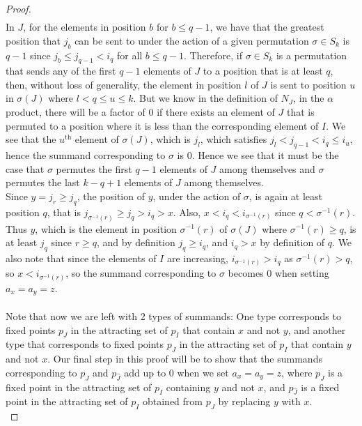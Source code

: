 \documentclass[12 pt]{article}
\theoremstyle{plain}
\theoremstyle{plain}
\theoremstyle{plain}
\theoremstyle{plain}
\theoremstyle{plain}
\theoremstyle{plain}
\theoremstyle{plain}
\theoremstyle{plain}
\theoremstyle{plain}
\theoremstyle{plain}
\theoremstyle{remark}
\theoremstyle{remark}
\theoremstyle{definition}
\theoremstyle{definition}
\theoremstyle{definition}
\theoremstyle{definition}
\theoremstyle{definition}
\theoremstyle{definition}
\begin{document}
\begin{proof}
\begin{align*}
\end{align*}
In $J$, for the elements in position $b$ for $b \leq q-1$, we have that the greatest position that $j_b$ can be sent to under the action of a given permutation $\sigma \in S_k$ is $q-1$ since $j_b \leq j_{q-1} < i_q$ for all $b \leq q-1$. Therefore, if $\sigma \in S_k$ is a permutation that sends any of the first $q-1$ elements of $J$ to a position that is at least $q$, then, without loss of generality, the element in position $l$ of $J$ is sent to position $u$ in $\sigma(J)$ where $l < q \leq u 
\leq k$. But we know in the definition of $N_J$, in the $\alpha$ product, there will be a factor of 0 if there exists an element of $J$ that is permuted to a position where it is less than the corresponding element of $I$. We see that the $u^{\text{th}}$ element of $\sigma(J)$, which is $j_l$, which satisfies $j_l < j_{q-1} < i_q \leq i_u$, hence the summand corresponding to $\sigma$ is 0. Hence we see that it must be the case that $\sigma$ permutes the first $q-1$ elements of $J$ among themselves and $\sigma$ permutes the last $k-q+1$ elements of $J$ among themselves.\\
Since $y = j_r \geq j_q$, the position of $y$, under the action of $\sigma$, is again at least position $q$, that is $j_{\sigma^{-1}(r)} \geq j_q > i_q > x$. Also, $x < i_q < i_{\sigma^{-1}(r)}$ since $q < \sigma^{-1}(r)$.\\
Thus $y$, which is the element in position $\sigma^{-1}(r)$ of $\sigma(J)$ where $\sigma^{-1}(r) \geq q$, is at least $j_q$ since $r \geq q$, and by definition $j_q \geq i_q$, and $i_q > x$ by definition of $q$. We also note that since the elements of $I$ are increasing, $i_{\sigma^{-1}(r)} > i_q$ as $\sigma^{-1}(r) > q$, so $x<i_{\sigma^{-1}(r)}$, so the summand corresponding to $\sigma$ becomes 0 when setting $a_x = a_y = z$.\\\\
Note that now we are left with 2 types of summands: One type corresponds to fixed points $p_{J}$ in the attracting set of $p_{I}$ that contain $x$ and not $y$, and another type that corresponds to fixed points $p_{J}$ in the attracting set of $p_{I}$ that contain $y$ and not $x$. Our final step in this proof will be to show that the summands corresponding to $p_{J}$ and $p_{\hat{J}}$ add up to 0 when we set $a_{x}=a_{y}=z$, where $p_{J}$ is a fixed point in the attracting set of $p_{I}$ containing $y$ and not $x$, and $p_{\hat{J}}$ is a fixed point in the attracting set of $p_{I}$ obtained from $p_{J}$ by replacing $y$ with $x$. \\


\end{proof}
\end{document}

